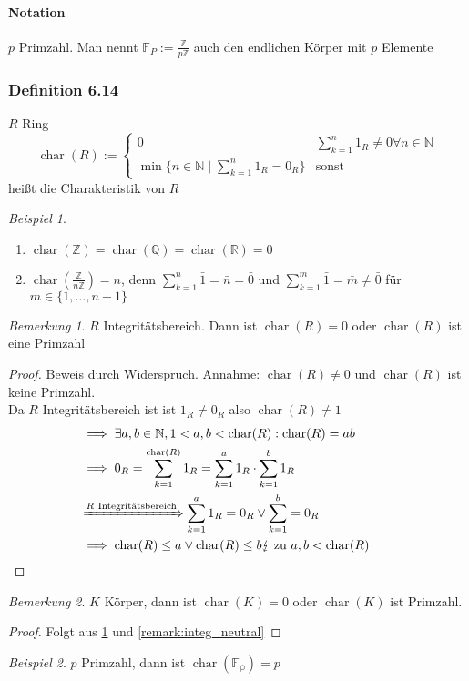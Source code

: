 \documentclass[a4paper]{scrartcl}
\DeclareMathOperator{\Forall}{\forall}
\DeclareMathOperator{\cha}{char}
\theoremstyle{definition}
\theoremstyle{plain}
\theoremstyle{plain}
\theoremstyle{remark}
\newtheorem{remark}{Bemerkung}
\theoremstyle{remark}
\theoremstyle{remark}
\theoremstyle{remark}
\theoremstyle{remark}
\newtheorem{ex}{Beispiel}
\begin{document}
\paragraph{Notation}
\label{sec-3-3-4-2}
$p$ Primzahl. Man nennt $\mathbb{F}_P := \frac{\mathbb{Z}}{p\mathbb{Z}}$ auch den endlichen Körper mit $p$ Elemente
\subsubsection{Definition 6.14}
\label{sec-3-3-5}
$R$ Ring
\[\cha(R):=\begin{cases} 0 & \sum_{k = 1}^n 1_R \neq 0 \Forall n\in\mathbb{N} \\ \min\{n\in\mathbb{N}\mid \sum_{k = 1}^n 1_R = 0_R\} & \text{sonst}\end{cases}\]
heißt die Charakteristik von $R$
\begin{ex} \mbox{}
\begin{enumerate}
\item $\cha(\mathbb{Z}) = \cha(\mathbb{Q}) = \cha(\mathbb{R}) = 0$
\item $\cha(\frac{\mathbb{Z}}{n\mathbb{Z}}) = n$, denn $\sum_{k = 1}^n \bar 1 = \bar n = \bar 0$ und $\sum_{k = 1}^m \bar 1 = \bar m \neq \bar 0$ für $m\in\{1,\ldots,n - 1\}$
\end{enumerate}
\end{ex}
\begin{remark}
\label{remark:cha_prim}
$R$ Integritätsbereich. Dann ist $\cha(R) = 0$ oder $\cha(R)$ ist eine Primzahl
\end{remark}
\begin{proof}
Beweis durch Widerspruch. Annahme: $\cha(R) \neq 0$ und $\cha(R)$ ist keine Primzahl. \\
Da $R$ Integritätsbereich ist ist $1_R \neq 0_R$ also $\cha(R) \neq 1$
\begin{align*}
&\implies \exists a,b\in\mathbb{N}, 1 < a,b < \cha(R): \cha(R) = a b \\
&\implies 0_R = \sum_{k = 1}^{\cha(R)} 1_R = \sum_{k = 1}^a 1_R \cdot \sum_{k = 1}^b 1_R \\
&\xRightarrow{R~\text{Integritätsbereich}} \sum_{k = 1}^a 1_R = 0_R \vee \sum_{k = 1}^b = 0_R \\
&\implies \cha(R) \leq a \vee \cha(R)\leq b \lightning~\text{zu}~ a,b < \cha(R) \tag*{\qedhere}
\end{align*}
\end{proof}
\begin{remark}
$K$ Körper, dann ist $\cha(K) = 0$ oder $\cha(K)$ ist Primzahl.
\end{remark}
\begin{proof}
Folgt aus \ref{remark:cha_prim} und \ref{remark:integ_neutral}
\end{proof}
\begin{ex}
$p$ Primzahl, dann ist $\cha(\mathbb{F_p}) = p$
\end{ex}
\end{document}
